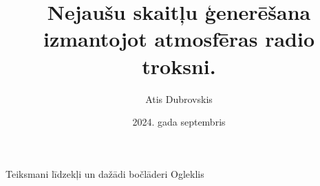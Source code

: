 \documentclass[12pt, a4paper]{article}
\author{Atis Dubrovskis}
\title{Nejaušu skaitļu ģenerēšana izmantojot atmosfēras radio troksni.}
\date{2024. gada septembris}
\begin{document}
\maketitle
Teiksmani līdzekļi un dažādi bočlāderi Ogleklis
\end{document}
